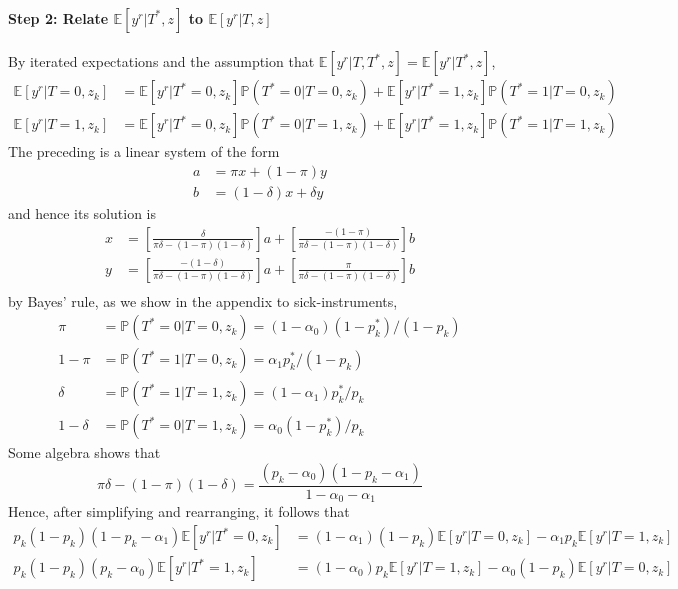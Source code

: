 \documentclass[12pt]{article}
\begin{document}
\paragraph{Step 2: Relate $\mathbb{E}[y^r|T^*,z]$ to $\mathbb{E}[y^r|T,z]$}
By iterated expectations and the assumption that $\mathbb{E}\left[ y^r|T,T^*,z \right]= \mathbb{E}\left[ y^r|T^*,z \right]$,
\begin{align*}
  \mathbb{E}\left[ y^r|T=0, z_k \right] &= \mathbb{E}\left[ y^r|T^*=0, z_k \right]\mathbb{P}(T^*=0|T=0, z_k) + \mathbb{E}\left[ y^r|T^*=1, z_k \right]\mathbb{P}(T^*=1|T=0, z_k)\\
  \mathbb{E}\left[ y^r|T=1, z_k \right] &= \mathbb{E}\left[ y^r|T^*=0, z_k \right]\mathbb{P}(T^*=0|T=1, z_k) + \mathbb{E}\left[ y^r|T^*=1, z_k \right]\mathbb{P}(T^*=1|T=1, z_k)
\end{align*}
The preceding is a linear system of the form
\begin{align*}
  a &= \pi x + (1 - \pi)y \\
  b &= (1 - \delta) x + \delta y
\end{align*}
and hence its solution is
\begin{align*}
  x &= \left[ \frac{\delta}{\pi\delta - (1 - \pi)(1 - \delta)} \right] a + \left[ \frac{-(1 - \pi)}{\pi \delta - (1 - \pi)(1 - \delta)} \right] b\\
  y &= \left[ \frac{-(1 - \delta)}{\pi\delta - (1 - \pi)(1 - \delta)} \right] a + \left[ \frac{\pi}{\pi \delta - (1 - \pi)(1 - \delta)} \right] b\\
\end{align*}
by Bayes' rule, as we show in the appendix to sick-instruments,
\begin{align*}
  \pi &= \mathbb{P}(T^*=0|T=0, z_k) =(1 - \alpha_0)(1 - p_k^*)/(1 - p_k)\\
  1 - \pi &= \mathbb{P}(T^*=1|T=0, z_k) =\alpha_1p_k^*/(1 - p_k)\\
  \delta &= \mathbb{P}(T^*=1|T=1, z_k) =(1 - \alpha_1)p_k^*/p_k\\
  1-\delta &= \mathbb{P}(T^*=0|T=1, z_k) = \alpha_0 (1 - p_k^*)/p_k
\end{align*}
Some algebra shows that 
\[
  \pi\delta - (1 - \pi)(1 - \delta) = \frac{(p_k - \alpha_0)(1 - p_k - \alpha_1)}{1 - \alpha_0 - \alpha_1}
\]
Hence, after simplifying and rearranging, it follows that 
\begin{align*}
  p_k(1 - p_k)(1 - p_k - \alpha_1)\mathbb{E}\left[ y^r|T^*=0, z_k \right] &= (1 - \alpha_1)(1 - p_k) \mathbb{E}[y^r|T=0, z_k] - \alpha_1 p_k \mathbb{E}[y^r|T=1,z_k]\\
  p_k(1 - p_k)(p_k - \alpha_0)\mathbb{E}\left[ y^r|T^*=1, z_k \right] &= (1 - \alpha_0)p_k\mathbb{E}[y^r|T=1,z_k] - \alpha_0(1 - p_k) \mathbb{E}[y^r|T=0,z_k]
\end{align*}
\end{document}
